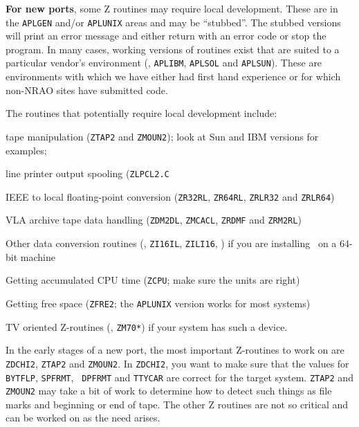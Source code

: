 
{\bf For new ports}, some Z routines may require local development.  These are
in the {\tt\dol APLGEN} and/or {\tt\dol APLUNIX} areas and may be ``stubbed''.
The stubbed versions will print an error message and either return with
an error code or stop the program.  In many cases, working versions of
routines exist that are suited to a particular vendor's environment
(\eg, {\tt\dol APLIBM}, {\tt\dol APLSOL} and {\tt\dol APLSUN}).  These are
environments with which we have either had first hand experience or for
which non-NRAO sites have submitted code.

The routines that potentially require local development include:
\medskip

\item\bul tape manipulation ({\tt ZTAP2} and {\tt ZMOUN2}); look
                 at Sun and IBM versions for examples;
\item\bul line printer output spooling ({\tt ZLPCL2.C}
\item\bul IEEE to local floating-point conversion ({\tt ZR32RL},
                 {\tt ZR64RL}, {\tt ZRLR32} and {\tt ZRLR64})
\item\bul VLA archive tape data handling ({\tt ZDM2DL},
                 {\tt ZMCACL}, {\tt ZRDMF} and {\tt ZRM2RL})
\item\bul Other data conversion routines (\eg, {\tt ZI16IL},
                 {\tt ZILI16}, \etc) if you are installing \AIPS\ on a
                 64-bit machine
\item\bul Getting accumulated CPU time ({\tt ZCPU}; make sure
                 the units are right)
\item\bul Getting free space ({\tt ZFRE2}; the {\tt\dol APLUNIX}
                 version works for most systems)
\item\bul TV oriented Z-routines (\eg, {\tt ZM70*}) if your
                 system has such a device.

\medskip\noindent
In the early stages of a new port, the most important Z-routines to work
on are {\tt ZDCHI2}, {\tt ZTAP2} and {\tt ZMOUN2}.  In {\tt ZDCHI2}, you
want to make sure that the values for {\tt BYTFLP}, {\tt SPFRMT}, {\tt
DPFRMT} and {\tt TTYCAR} are correct for the target system.  {\tt ZTAP2}
and {\tt ZMOUN2} may take a bit of work to determine how to detect such
things as file marks and beginning or end of tape.  The other Z routines
are not so critical and can be worked on as the need arises.

